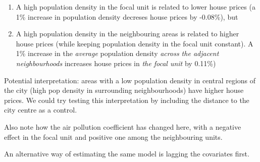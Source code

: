 \documentclass[
  letterpaper,
  DIV=11,
  numbers=noendperiod]{scrreprt}
\begin{document}
\begin{tcolorbox}[enhanced jigsaw, opacitybacktitle=0.6, left=2mm, leftrule=.75mm, toptitle=1mm, breakable, colback=white, bottomrule=.15mm, colframe=quarto-callout-tip-color-frame, colbacktitle=quarto-callout-tip-color!10!white, coltitle=black, bottomtitle=1mm, titlerule=0mm, title=\textcolor{quarto-callout-tip-color}{\faLightbulb}\hspace{0.5em}{Interpretaion SLX}, opacityback=0, arc=.35mm, rightrule=.15mm, toprule=.15mm]

\begin{enumerate}
\def\labelenumi{\arabic{enumi}.}
\item
  A high population density in the focal unit is related to lower house
  prices (a 1\% increase in population density decreses house prices by
  -0.08\%), but
\item
  A high population density in the neighbouring areas is related to
  higher house prices (while keeping population density in the focal
  unit constant). A 1\% increase in the \emph{average} population
  density \emph{across the adjacent neighbourhoods} increases house
  prices in \emph{the focal unit} by 0.11\%)
\end{enumerate}

Potential interpretation: areas with a low population density in central
regions of the city (high pop density in surrounding neighbourhoods)
have higher house prices. We could try testing this interpretation by
including the distance to the city centre as a control.

\end{tcolorbox}

Also note how the air pollution coefficient has changed here, with a
negative effect in the focal unit and positive one among the
neighbouring units.

An alternative way of estimating the same model is lagging the
covariates first.
\end{document}
